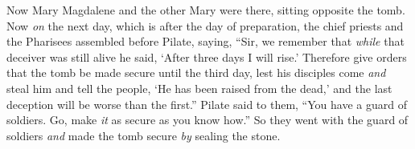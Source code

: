 \begin{biblechapter}
\verse Now Mary Magdalene and the other Mary were there, sitting opposite the tomb.
 Now \textit{on} the next day, which is after the day of preparation, the chief priests and the Pharisees assembled before Pilate,
\verse saying, “Sir, we remember that \textit{while} that deceiver was still alive he said, ‘After three days I will rise.’
\verse Therefore give orders that the tomb be made secure until the third day, lest his disciples come \textit{and} steal him and tell the people, ‘He has been raised from the dead,’ and the last deception will be worse than the first.”
\verse Pilate said to them, “You have a guard of soldiers. Go, make \textit{it} as secure as you know how.”
\verse So they went with the guard of soldiers \textit{and} made the tomb secure \textit{by} sealing the stone.
\end{biblechapter}

